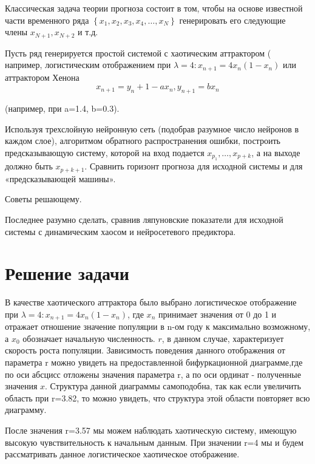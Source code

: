\documentclass[a4paper]{article}
\begin{document}
Классическая задача теории прогноза состоит в том, чтобы на основе известной части временного ряда $\left \{ x_1, x_2, x_3, x_4, \dots, x_N \right \}$ генерировать его следующие члены $x_{N+1}, x_{N+2}$  и т.д.

Пусть ряд генерируется простой системой с хаотическим аттрактором ( например, логистическим отображением при $\lambda=4 : x_{n+1} = 4x_n(1-x_n)$ или аттрактором Хенона
\begin{equation*}
x_{n+1} = y_n + 1 -ax_n, y_{n+1}=bx_n
\end{equation*}

(например, при a=1.4, b=0.3).

Используя трехслойную нейронную сеть (подобрав разумное число нейронов в каждом слое), алгоритмом обратного распространения ошибки, построить предсказывающую систему, которой на вход подается $x_{p_1}, \dots, x_{p+k}$, а на выходе должно быть $x_{p+k+1}$. Сравнить горизонт прогноза для исходной системы и для «предсказывающей машины».

Советы решающему.

Последнее разумно сделать, сравнив ляпуновские показатели для исходной системы с динамическим хаосом и нейросетевого предиктора.

\newpage

\section{Решение задачи}

В качестве хаотического аттрактора было выбрано логистическое отображение при $\lambda=4 : x_{n+1} = 4x_n(1-x_n)$, где $x_n$ принимает значения от 0 до 1 и отражает отношение значение популяции в n-ом году к максимально возможному, а $x_0$ обозначает начальную численность. $r$, в данном случае, характеризует скорость роста популяции. Зависимость поведения данного отображения от параметра r можно увидеть на предоставленной бифуркационной диаграмме,где по оси абсцисс отложены значения параметра r, а по оси ординат - полученные значения $x$. Структура данной диаграммы самоподобна, так как если увеличить область при r=3.82, то можно увидеть, что структура этой области повторяет всю диаграмму.

После значения r=3.57 мы можем наблюдать хаотическую систему, имеющую высокую чувствительность к начальным данным. При значении r=4 мы и будем рассматривать данное логистическое хаотическое отображение.   
\end{document}
